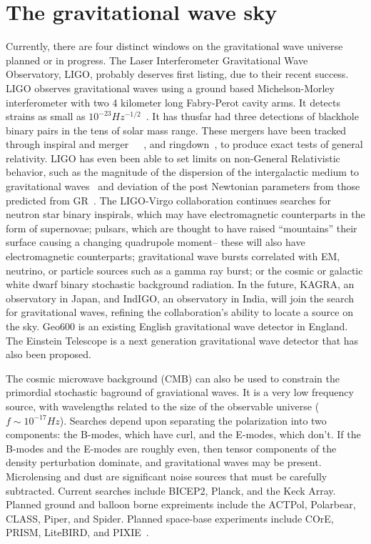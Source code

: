 \section{The gravitational wave sky}
Currently, there are four distinct windows on the gravitational wave universe planned or in progress. The Laser Interferometer Gravitational Wave Observatory, LIGO, probably deserves first listing, due to their recent success. LIGO observes gravitational waves using a ground based Michelson-Morley interferometer with two 4 kilometer long Fabry-Perot cavity arms. It detects strains as small as $10^{-23} Hz^{-1/2}$~\cite{LIGOsensitivity}. It has thusfar had three detections of blackhole binary pairs in the tens of solar mass range. These mergers have been tracked through inspiral and merger~\cite{GW150914}~\cite{GW151226}~\cite{GW170104}, and ringdown~\cite{LIGO1e}, to produce exact tests of general relativity. LIGO has even been able to set limits on non-General Relativistic behavior, such as the magnitude of the dispersion of the intergalactic medium to gravitational waves~\cite{GW170104} and deviation of the post Newtonian parameters from those predicted from GR~\cite{LIGO1e}. The LIGO-Virgo collaboration continues searches for neutron star binary inspirals, which may have electromagnetic counterparts in the form of supernovae; pulsars, which are thought to have raised ``mountains'' their surface causing a changing quadrupole moment-- these will also have electromagnetic counterparts; gravitational wave bursts correlated with EM, neutrino, or particle sources such as a gamma ray burst; or the cosmic or galactic white dwarf binary stochastic background radiation. In the future, KAGRA, an observatory in Japan, and IndIGO, an observatory in India, will join the search for gravitational waves, refining the collaboration's ability to locate a source on the sky. Geo600 is an existing English gravitational wave detector in England. The Einstein Telescope is a next generation gravitational wave detector that has also been proposed. 


The cosmic microwave background (CMB) can also be used to constrain the primordial stochastic baground of graviational waves. It is a very low frequency source, with wavelengths related to the size of the observable universe ($f\sim 10^{-17} Hz$). Searches depend upon separating the polarization into two components: the B-modes, which have curl, and the E-modes, which don't. If the B-modes and the E-modes are roughly even, then tensor components of the density perturbation dominate, and gravitational waves may be present. Microlensing and dust are significant noise sources that must be carefully subtracted. Current searches include BICEP2, Planck, and the Keck Array. Planned ground and balloon borne expreiments include the ACTPol, Polarbear, CLASS, Piper, and Spider. Planned space-base experiments include COrE, PRISM, LiteBIRD, and PIXIE~\cite{bmodes}. 


